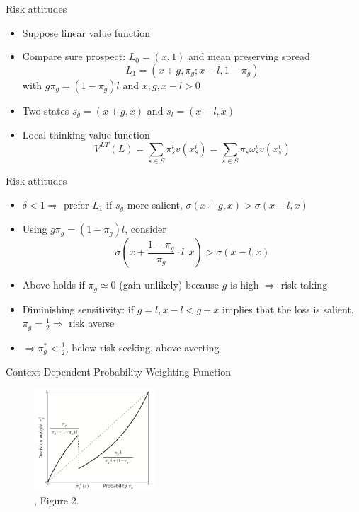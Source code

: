 \begin{frame}{Risk attitudes}
        \begin{itemize}
            \item Suppose linear value function\medskip
            \item Compare sure prospect: $L_0=(x,1)$ and mean preserving spread \[L_1=\left(x+g, \pi_g ; x-l, 1-\pi_g\right)\] with $g \pi_g=\left(1-\pi_g\right) l$ and $x, g, x-l >0$\medskip
            \item Two states $s_g = (x + g, x)$ and  $s_l=(x-l, x)$\medskip
            \item Local thinking value function \[V^{LT}(L)=\sum_{s \in S} \pi^i_s v\left(x_s^i\right)=\sum_{s \in S} \pi_s \omega ^i_s v\left(x_s^i\right)\]\medskip
        \end{itemize}
    \end{frame}

\begin{frame}{Risk attitudes}
    \begin{itemize}
        \item $\delta<1 \Rightarrow$ prefer $L_1$ if $s_g$ more salient, $\sigma(x+g, x)>\sigma(x-l, x)$\medskip
        \item  Using $g \pi_g=\left(1-\pi_g\right) l$, consider \[\sigma\left(x+\frac{1-\pi_g}{\pi_g} \cdot l, x\right)>\sigma(x-l, x)\]
        \item Above holds if $\pi_g \simeq 0$ (gain unlikely) because $g$ is high $\Rightarrow$ risk taking\medskip
        \item Diminishing sensitivity: if $g=l, x-l<g+x$ implies that the loss is salient,$\pi_g=\frac{1}{2} \Rightarrow$ risk averse\medskip
        \item $\Rightarrow \pi^*_g <\frac{1}{2}$, below risk seeking, above averting\medskip
    \end{itemize}
\end{frame}


\begin{frame}{Context-Dependent Probability Weighting Function}
\begin{figure}
\centering
    \includegraphics[width = 0.4\textwidth]{context_dependent_weighting}
    \caption{\citet{BordaloGennaioliShleifer2012}, Figure 2.}
    \end{figure}
\end{frame}


